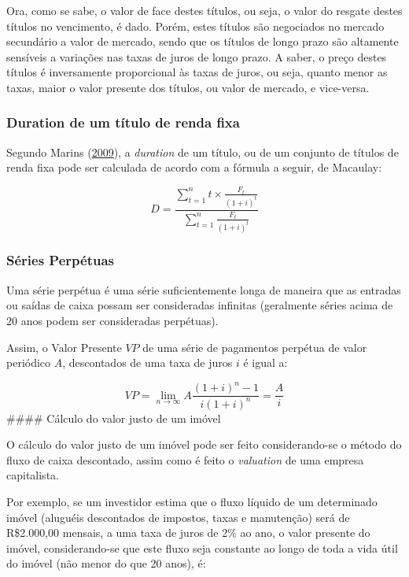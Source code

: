 \documentclass[
	12pt,				%
	oneside,			%
	a4paper,			%
	chapter=TITLE,		%
	section=TITLE,		%
	english,			%
	brazil				%
	]{abntex2}
\begin{document}
Ora, como se sabe, o valor de face destes títulos, ou seja, o valor do resgate
destes títulos no vencimento, é dado. Porém, estes títulos são negociados no
mercado secundário a valor de mercado, sendo que os títulos de longo prazo são
altamente sensíveis a variações nas taxas de juros de longo prazo. A saber, o
preço destes títulos é inversamente proporcional às taxas de juros, ou seja,
quanto menor as taxas, maior o valor presente dos títulos, ou valor de mercado,
e vice-versa.

\hypertarget{duration-de-um-tuxedtulo-de-renda-fixa}{%
\subsubsection{Duration de um título de renda fixa}\label{duration-de-um-tuxedtulo-de-renda-fixa}}

Segundo Marins (\protect\hyperlink{ref-marins1}{2009}), a \emph{duration} de um título, ou de um conjunto de títulos de
renda fixa pode ser calculada de acordo com a fórmula a seguir, de Macaulay:

\[D = \frac{\sum_{t = 1}^{n}t \times \frac{F_t}{(1+i)^t}}{\sum_{t = 1}^{n} \frac{F_t}{(1+i)^t}}\]

\hypertarget{suxe9ries-perpuxe9tuas}{%
\subsubsection{Séries Perpétuas}\label{suxe9ries-perpuxe9tuas}}

Uma série perpétua é uma série suficientemente longa de maneira que as entradas
ou saídas de caixa possam ser consideradas infinitas (geralmente séries acima de
20 anos podem ser consideradas perpétuas).

Assim, o Valor Presente \(VP\) de uma série de pagamentos perpétua de valor
periódico \(A\), descontados de uma taxa de juros \(i\) é igual a:

\[VP = \lim_{n \to \infty} A \frac{(1+i)^n-1}{i(1+i)^n}= \frac{A}{i}\]
\#\#\#\# Cálculo do valor justo de um imóvel

O cálculo do valor justo de um imóvel pode ser feito considerando-se o método
do fluxo de caixa descontado, assim como é feito o \emph{valuation} de uma empresa
capitalista.

Por exemplo, se um investidor estima que o fluxo líquido de um determinado
imóvel (aluguéis descontados de impostos, taxas e manutenção) será de R\$2.000,00
mensais, a uma taxa de juros de 2\% ao ano, o valor presente do imóvel,
considerando-se que este fluxo seja constante ao longo de toda a vida útil do
imóvel (não menor do que 20 anos), é:
\end{document}
